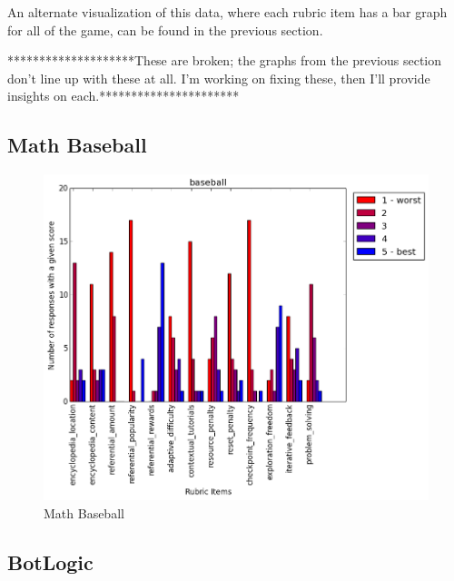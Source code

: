 			An alternate visualization of this data, where each rubric item has a bar graph for all of the game, can be found in the previous section.

			********************These are broken; the graphs from the previous section don't line up with these at all. I'm working on fixing these, then I'll provide insights on each.**********************

			\subsection{Math Baseball}

				\begin{figure}[] 
				\centering 
				\includegraphics[width=\textwidth, height=.4\textheight, keepaspectratio=true]{baseball_scores.png} 
				\caption{Math Baseball}
				\end{figure}

			\subsection{BotLogic}

